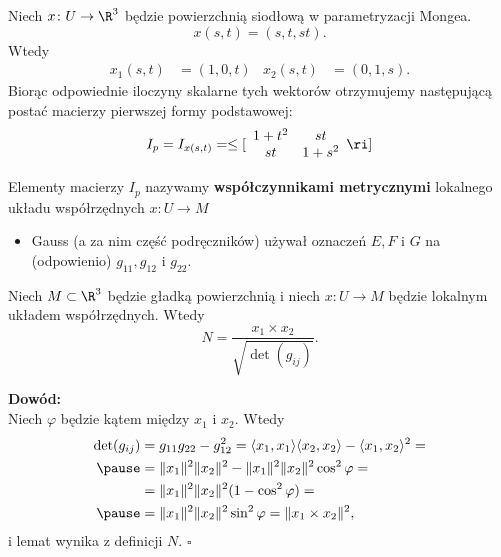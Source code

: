 \begin{frame}
\begin{przyklad}
Niech $x\colon U\to \R^3$ będzie powierzchnią siodłową w parametryzacji Mongea.
\[x(s,t)=(s,t,st).\]
\pause Wtedy 
\begin{align*}
x_1(s,t)&=(1,0,t) & x_2(s,t)&=(0,1,s).
\end{align*}
\pause Biorąc odpowiednie iloczyny skalarne tych wektorów otrzymujemy następującą postać macierzy pierwszej formy podstawowej:
\pause \[
I_{p}=I_{x(s,t)}=\le[\begin{array}{cc}
1+t^2&st\\
st & 1+s^2
\end{array}\ri]
\]

\end{przyklad}


\end{frame}
\begin{frame}[<+->]


\begin{definicja}
Elementy macierzy $I_p$ nazywamy \textbf{współczynnikami metrycznymi} lokalnego układu współrzędnych $x\colon U\to M$
\end{definicja}

\begin{uwaga}
\begin{itemize}
\item Gauss (a za nim część podręczników) używał oznaczeń $E,F$ i $G$ na (odpowienio) $g_{11},g_{12}$ i $g_{22}$.
\end{itemize}
\end{uwaga}


\end{frame}
\begin{frame}

\begin{lemat}
Niech $M\subset \R^3$ będzie gładką powierzchnią i niech $x\colon U\to M$ będzie lokalnym układem współrzędnych. Wtedy
\[N=\frac{x_1\times x_2}{\sqrt{\det(g_{ij})}}.\]
\end{lemat}
\pause \textcolor{ared}{\textbf{Dowód:}}\\\pause
Niech $\varphi$ będzie kątem między $x_1$ i $x_2$. Wtedy
\begin{align*}
\det(g_{ij})
&= g_{11}g_{22}-g_{12}^2=\langle x_1 ,x_1\rangle\langle x_2 ,x_2\rangle-\langle x_1 ,x_2\rangle^2=\\\pause
&= \|x_1\|^2\|x_2\|^2-\|x_1\|^2\|x_2\|^2\cos^2 \varphi=\\
&=\|x_1\|^2\|x_2\|^2(1-\cos^2\varphi)=\\\pause
&= \|x_1\|^2\|x_2\|^2\sin^2\varphi= \|x_1\times x_2\|^2,
\end{align*}
i lemat wynika z definicji $N$.
\hfill $\square$
\end{frame}

